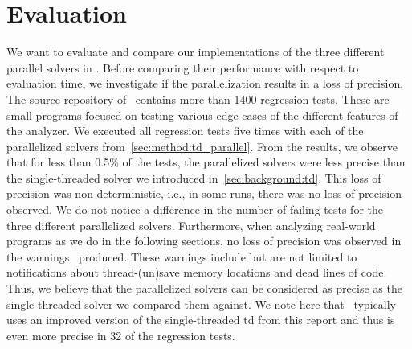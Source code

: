 \section{Evaluation}
\label{sec:eval}
We want to evaluate and compare our implementations of the three different parallel solvers in \gob. Before comparing their performance with respect to evaluation time, we investigate if the parallelization results in a loss of precision.
The source repository of \gob\ contains more than 1400 regression tests. These are small programs focused on testing various edge cases of the different features of the analyzer. We executed all regression tests five times with each of the parallelized solvers from~\autoref{sec:method:td_parallel}. From the results, we observe that for less than 0.5\% of the tests, the parallelized solvers were less precise than the single-threaded solver we introduced in~\autoref{sec:background:td}. This loss of precision was non-deterministic, i.e., in some runs, there was no loss of precision observed. We do not notice a difference in the number of failing tests for the three different parallelized solvers. Furthermore, when analyzing real-world programs as we do in the following sections, no loss of precision was observed in the warnings \gob\ produced. These warnings include but are not limited to notifications about thread-(un)save memory locations and dead lines of code. Thus, we believe that the parallelized solvers can be considered as precise as the single-threaded solver we compared them against. We note here that \gob\ typically uses an improved version of the single-threaded \ac{td} from this report and thus is even more precise in 32 of the regression tests.

